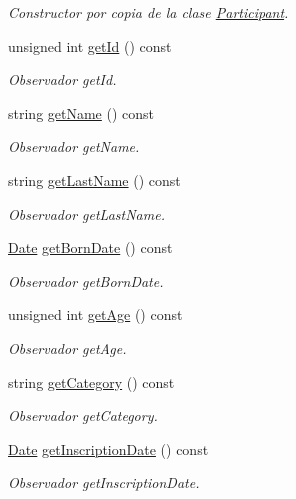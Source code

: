 \begin{DoxyCompactItemize}
\begin{DoxyCompactList}\small\item\em Constructor por copia de la clase \hyperlink{class_participant}{Participant}. \end{DoxyCompactList}\item 
unsigned int \hyperlink{class_participant_a7242a5ed6ceeba1b988297b4b1a29d2a}{get\+Id} () const 
\begin{DoxyCompactList}\small\item\em Observador get\+Id. \end{DoxyCompactList}\item 
string \hyperlink{class_participant_ae2fba0dcb273c86fbb3f295ca3c2a2b3}{get\+Name} () const 
\begin{DoxyCompactList}\small\item\em Observador get\+Name. \end{DoxyCompactList}\item 
string \hyperlink{class_participant_a9c05497ee615701e9f27c7114cf489be}{get\+Last\+Name} () const 
\begin{DoxyCompactList}\small\item\em Observador get\+Last\+Name. \end{DoxyCompactList}\item 
\hyperlink{class_date}{Date} \hyperlink{class_participant_ad969a57fb589033f35fbe82f57a8b765}{get\+Born\+Date} () const 
\begin{DoxyCompactList}\small\item\em Observador get\+Born\+Date. \end{DoxyCompactList}\item 
unsigned int \hyperlink{class_participant_afa2be326323515c15d8aaed642907680}{get\+Age} () const 
\begin{DoxyCompactList}\small\item\em Observador get\+Age. \end{DoxyCompactList}\item 
string \hyperlink{class_participant_a14ab6b07cc3e632fa353d15ecabcab8b}{get\+Category} () const 
\begin{DoxyCompactList}\small\item\em Observador get\+Category. \end{DoxyCompactList}\item 
\hyperlink{class_date}{Date} \hyperlink{class_participant_a0d720e44b2611994d03a7f8de682e414}{get\+Inscription\+Date} () const 
\begin{DoxyCompactList}\small\item\em Observador get\+Inscription\+Date. \end{DoxyCompactList}\item 

\end{DoxyCompactItemize}
